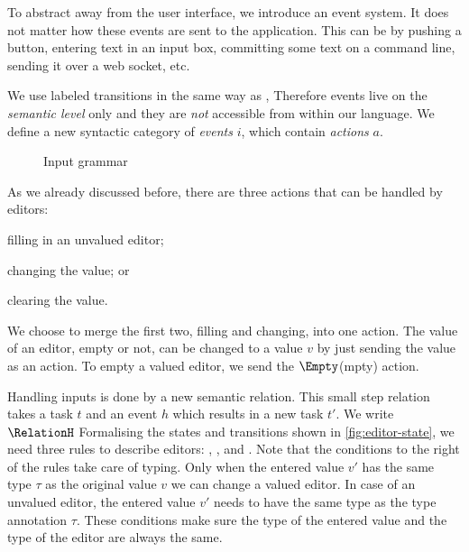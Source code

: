 To abstract away from the user interface,
we introduce an event system.
It does not matter how these events are sent to the application.
This can be by pushing a button,
entering text in an input box,
committing some text on a command line,
sending it over a web socket,
etc.

%
We use labeled transitions in the same way as \textcite{school/maktoberdorf/PeytonJones01},
Therefore events live on the \emph{semantic level} only
and they are \emph{not} accessible from within our language.
We define a new syntactic category of \emph{events} $i$,
which contain \emph{actions} $a$.

\begin{figure}[h]
  \small
  \caption{Input grammar} \label{fig:input-grammar}
\end{figure}

As we already discussed before,
there are three actions that can be handled by editors:
\begin{enumerate*}
  \item filling in an unvalued editor;
  \item changing the value; or
  \item clearing the value.
\end{enumerate*}
We choose to merge the first two, filling and changing, into one action.
The value of an editor, empty or not, can be changed to a value $v$ by just sending the value as an action.
To empty a valued editor, we send the $\Empty$(mpty) action.

Handling inputs is done by a new semantic relation.
This small step relation takes a task $t$ and an event $h$ which results in a new task $t'$.
We write $\RelationH$
Formalising the states and transitions shown in \autoref{fig:editor-state},
we need three rules to describe editors:
, , and .
Note that the conditions to the right of the rules take care of typing.
Only when the entered value $v'$ has the same type $\tau$ as the original value $v$ we can change a valued editor.
In case of an unvalued editor,
the entered value $v'$ needs to have the same type as the type annotation $\tau$.
These conditions make sure the type of the entered value and the type of the editor are always the same.

